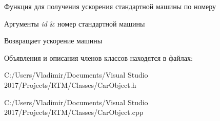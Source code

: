 Функция для получения ускорения стандартной машины по номеру 
\begin{DoxyParams}{Аргументы}
{\em id} & номер стандартной машины \\
\hline
\end{DoxyParams}
\begin{DoxyReturn}{Возвращает}
ускорение машины 
\end{DoxyReturn}


Объявления и описания членов классов находятся в файлах\+:\begin{DoxyCompactItemize}
\item 
C\+:/\+Users/\+Vladimir/\+Documents/\+Visual Studio 2017/\+Projects/\+R\+T\+M/\+Classes/Car\+Object.\+h\item 
C\+:/\+Users/\+Vladimir/\+Documents/\+Visual Studio 2017/\+Projects/\+R\+T\+M/\+Classes/Car\+Object.\+cpp\end{DoxyCompactItemize}
